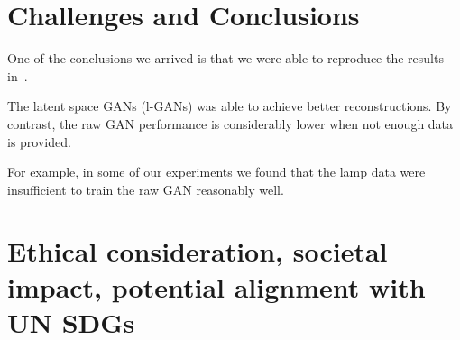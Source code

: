 \documentclass[12pt]{article}
\newcommand{\contentdescription}[1]{}
\begin{document}
    \section{Challenges and Conclusions}
    \contentdescription{
        Challenges and Conclusions (5-15\%):
        Challenges you faced when reimplementing the paper and conducting the experiments.
        Were all details in the paper?
        Or did you have to look in the authors code or even contact them to find about some details?
        Was parts of the code quite hard to get them to work as intended?
        Did you have optimize and tune several hyperparameters?
        Which ones?
        Did the framework you used make the implementation difficult in some ways?

        Summarize your key results - what have you learned?
        What points do you think one should consider when using the approach of the paper you chose for your project?
        Suggest ideas for future extensions or new applications of your ideas.
    }

    One of the conclusions we arrived is that we were able to reproduce the results in~\cite{pmlr-v80-achlioptas18a}.

    The latent space GANs (l-GANs) was able to achieve better reconstructions.
    By contrast, the raw GAN performance is considerably lower when not enough data is provided.

    For example, in some of our experiments we found that the lamp data were insufficient to train the raw GAN reasonably well.


    \section{Ethical consideration, societal impact, potential alignment with UN SDGs}
    \contentdescription{
        Ethical consideration, societal impact, potential alignment with UN SDGs (5-10\%):
        Think and research!
        Are there any ethical considerations for the original paper, its problem or method, its way of conducting experiments?
        How about your task, your datasets, and the experiments you did?
        What societal impact can you imagine about the original paper and its contributions and results?
        How about your project report?
        How do you think this paper can push the UN SDG targets?
    }
\end{document}
